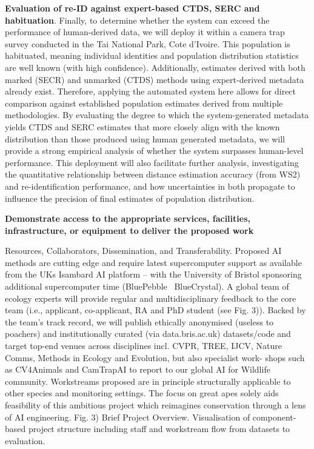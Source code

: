 \textbf{Evaluation of re-ID against expert-based CTDS, SERC and habituation}. Finally, to determine whether the system can exceed the performance of human-derived data, we will deploy it within a camera trap survey conducted in the Tai National Park, Cote d’Ivoire. This population is habituated,
meaning individual identities and population distribution statistics are well known (with high confidence). Additionally, estimates derived with both marked (SECR) and unmarked (CTDS) methods using expert-derived metadata already exist. Therefore, applying the automated system here allows for direct comparison against established population estimates derived from multiple methodologies. By evaluating the degree to which the system-generated metadata yields CTDS and SERC estimates that more closely align with the known distribution than those produced using human generated metadata, we will provide a strong empirical analysis of whether the system surpasses human-level performance. This deployment will also facilitate further analysis, investigating the quantitative relationship between distance estimation accuracy (from WS2) and re-identification performance, and how uncertainties in both propagate to influence the precision of final estimates of population distribution.





\textbf{Demonstrate access to the appropriate services, facilities, infrastructure, or equipment to deliver the proposed work}

Resources, Collaborators, Dissemination, and Transferability. Proposed AI methods are cutting edge and require latest supercomputer support as available from the UKs Isambard AI platform – with the University of Bristol sponsoring additional supercomputer time (BluePebble \ BlueCrystal). A global team of ecology experts will provide regular and multidisciplinary feedback to the core team (i.e., applicant, co-applicant, RA and PhD student (see Fig. 3)). Backed by the team’s track record, we will publish ethically anonymised (useless to poachers) and institutionally curated (via data.bris.ac.uk) datasets/code and target top-end venues across disciplines incl. CVPR, TREE, IJCV, Nature Comms, Methods in Ecology and Evolution, but also specialist work- shops such as CV4Animals and CamTrapAI to report to our global AI for Wildlife community. Workstreams proposed are in principle structurally applicable to other species and monitoring settings. The focus on great apes solely aids feasibility of this ambitious project which reimagines conservation through a lens of AI engineering. Fig. 3) Brief Project Overview. Visualisation of component-based project structure including staff and workstream flow from datasets to evaluation.










